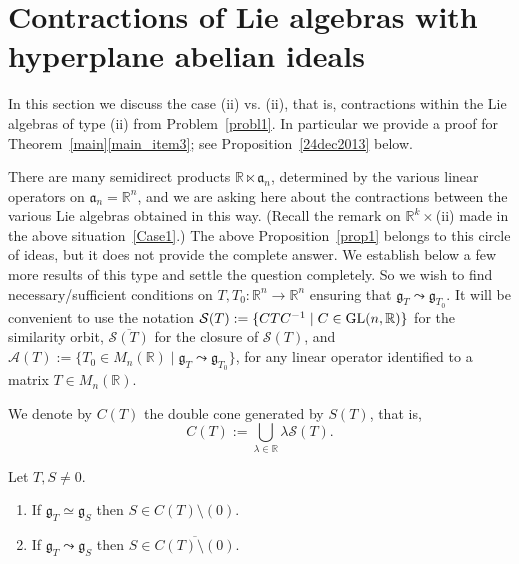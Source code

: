 \documentclass[
reqno]{amsart}
\begin{document}
\section{Contractions of Lie algebras with hyperplane abelian ideals}\label{Case5}

In this section we discuss the case (ii) vs. (ii), 
that is, contractions within the Lie algebras of type (ii) from Problem~\ref{probl1}. 
In particular we provide a proof for Theorem~\ref{main}\eqref{main_item3}; 
see Proposition~\ref{24dec2013} below. 

There are many semidirect products ${{\mathbb R}}\ltimes{{\mathfrak a}}_n$, 
determined by the various linear operators on ${{\mathfrak a}}_n={{\mathbb R}}^n$, 
and we are asking here about the contractions between the various Lie algebras  
obtained in this way. 
(Recall the remark on ${{\mathbb R}}^k\times$(ii) made in the above situation~\ref{Case1}.)
The above Proposition~\ref{prop1} belongs to this circle of ideas, 
but it does not provide the complete answer. 
We establish below a few more results of this type and settle the question completely. 
So we wish to find necessary/sufficient conditions on $T,T_0\colon{{\mathbb R}}^n\to{{\mathbb R}}^n$ 
ensuring that ${{\mathfrak g}}_T{\leadsto}{{\mathfrak g}}_{T_0}$.  
It will be convenient to use the notation ${{\mathcal S}}(T):=\{CTC^{-1}\mid C\in {{\rm GL}}(n,{{\mathbb R}})\}$ 
for the similarity orbit,  
$\overline{{{\mathcal S}}(T)}$ for the closure of ${{\mathcal S}}(T)$,  
and ${{\mathcal A}}(T):=\{T_0\in M_n({{\mathbb R}})\mid {{\mathfrak g}}_T{\leadsto}{{\mathfrak g}}_{T_0}\}$, 
for any linear operator identified to a matrix $T\in M_n({{\mathbb R}})$. 

We denote by $C(T)$ the double cone generated by $S(T)$, that is, 
$$C(T):=\bigcup_{\lambda \in {{\mathbb R}}}\lambda {{\mathcal S}}(T).$$

\begin{proposition}\label{24dec2013} 
Let $T, S\not= 0$. 
\begin{enumerate} 
\item If ${\mathfrak g}_T\simeq {\mathfrak g}_S$ then $S\in C(T)\setminus (0)$.

\item If ${\mathfrak g}_T{\leadsto} {\mathfrak g}_S$ then $S\in \overline {C(T)\setminus (0)}$.

\end{enumerate}  
\end{proposition}
\end{document}

